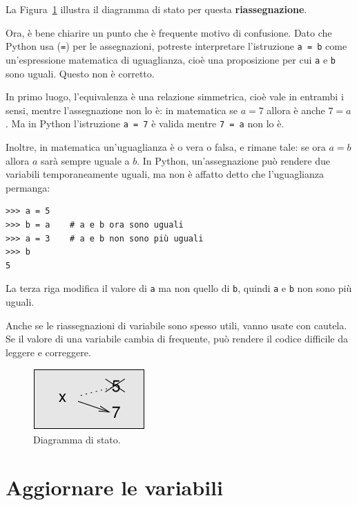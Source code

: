 \documentclass[10pt]{book}
\begin{document}
La Figura~\ref{fig.assign2} illustra il diagramma di stato per questa {\bf riassegnazione}. 

Ora, è bene chiarire un punto che è frequente motivo di confusione.
Dato che Python usa ({\tt =}) per le assegnazioni, potreste interpretare l'istruzione {\tt a = b} come un'espressione matematica di uguaglianza, cioè una proposizione per cui {\tt a} e {\tt b} sono uguali. Questo non è corretto.

In primo luogo, l'equivalenza è una relazione simmetrica, cioè vale in entrambi i sensi, mentre l'assegnazione non lo è: in matematica se $a=7$ allora è anche $7=a$. Ma in Python l'istruzione {\tt a = 7} è valida mentre {\tt 7 = a} non lo è.

Inoltre, in matematica un'uguaglianza è o vera o falsa, e rimane tale: se ora $a=b$ allora $a$ sarà sempre uguale a $b$.
In Python, un'assegnazione può rendere due variabili temporaneamente uguali, ma non è affatto detto che l'uguaglianza permanga:

\begin{verbatim}
>>> a = 5
>>> b = a    # a e b ora sono uguali
>>> a = 3    # a e b non sono più uguali
>>> b
5
\end{verbatim}
%
La terza riga modifica il valore di {\tt a} ma non quello di {\tt b}, quindi {\tt a} e {\tt b} non sono più uguali.

Anche se le riassegnazioni di variabile sono spesso utili, vanno usate con cautela. Se il valore di una variabile cambia di frequente, può rendere il codice difficile da leggere e correggere.

\begin{figure}
\centerline
{\includegraphics[scale=0.8]{figs/assign2.pdf}}
\caption{Diagramma di stato.}
\label{fig.assign2}
\end{figure}



\section{Aggiornare le variabili}
\label{update}

\end{document}
